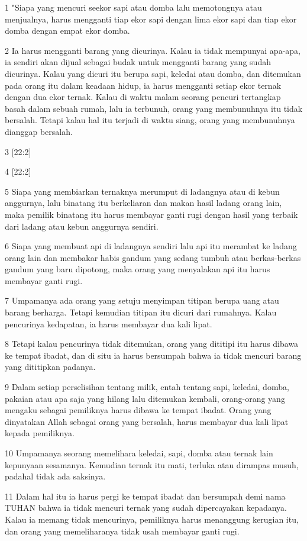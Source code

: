 \par 1 "Siapa yang mencuri seekor sapi atau domba lalu memotongnya atau menjualnya, harus mengganti tiap ekor sapi dengan lima ekor sapi dan tiap ekor domba dengan empat ekor domba.
\par 2 Ia harus mengganti barang yang dicurinya. Kalau ia tidak mempunyai apa-apa, ia sendiri akan dijual sebagai budak untuk mengganti barang yang sudah dicurinya. Kalau yang dicuri itu berupa sapi, keledai atau domba, dan ditemukan pada orang itu dalam keadaan hidup, ia harus mengganti setiap ekor ternak dengan dua ekor ternak. Kalau di waktu malam seorang pencuri tertangkap basah dalam sebuah rumah, lalu ia terbunuh, orang yang membunuhnya itu tidak bersalah. Tetapi kalau hal itu terjadi di waktu siang, orang yang membunuhnya dianggap bersalah.
\par 3 [22:2]
\par 4 [22:2]
\par 5 Siapa yang membiarkan ternaknya merumput di ladangnya atau di kebun anggurnya, lalu binatang itu berkeliaran dan makan hasil ladang orang lain, maka pemilik binatang itu harus membayar ganti rugi dengan hasil yang terbaik dari ladang atau kebun anggurnya sendiri.
\par 6 Siapa yang membuat api di ladangnya sendiri lalu api itu merambat ke ladang orang lain dan membakar habis gandum yang sedang tumbuh atau berkas-berkas gandum yang baru dipotong, maka orang yang menyalakan api itu harus membayar ganti rugi.
\par 7 Umpamanya ada orang yang setuju menyimpan titipan berupa uang atau barang berharga. Tetapi kemudian titipan itu dicuri dari rumahnya. Kalau pencurinya kedapatan, ia harus membayar dua kali lipat.
\par 8 Tetapi kalau pencurinya tidak ditemukan, orang yang dititipi itu harus dibawa ke tempat ibadat, dan di situ ia harus bersumpah bahwa ia tidak mencuri barang yang dititipkan padanya.
\par 9 Dalam setiap perselisihan tentang milik, entah tentang sapi, keledai, domba, pakaian atau apa saja yang hilang lalu ditemukan kembali, orang-orang yang mengaku sebagai pemiliknya harus dibawa ke tempat ibadat. Orang yang dinyatakan Allah sebagai orang yang bersalah, harus membayar dua kali lipat kepada pemiliknya.
\par 10 Umpamanya seorang memelihara keledai, sapi, domba atau ternak lain kepunyaan sesamanya. Kemudian ternak itu mati, terluka atau dirampas musuh, padahal tidak ada saksinya.
\par 11 Dalam hal itu ia harus pergi ke tempat ibadat dan bersumpah demi nama TUHAN bahwa ia tidak mencuri ternak yang sudah dipercayakan kepadanya. Kalau ia memang tidak mencurinya, pemiliknya harus menanggung kerugian itu, dan orang yang memeliharanya tidak usah membayar ganti rugi.
